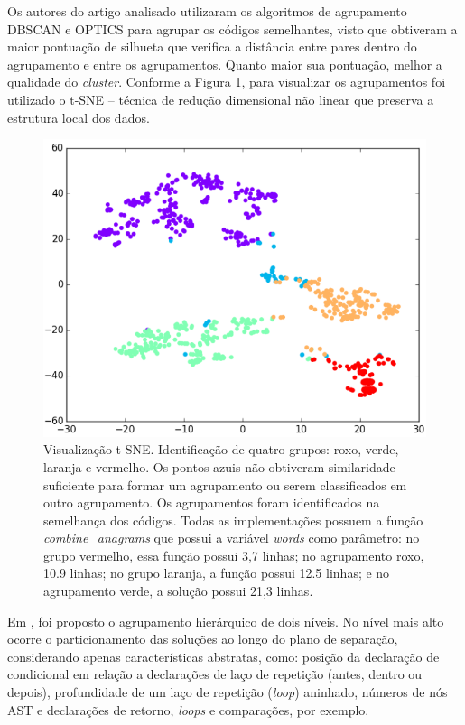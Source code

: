     Os autores do artigo analisado utilizaram os algoritmos de agrupamento
    DBSCAN\cite{Ester1996} e OPTICS\cite{Ankerst1999} para agrupar os códigos
    semelhantes, visto que obtiveram a maior pontuação de silhueta que verifica
    a distância entre pares dentro do agrupamento e entre os agrupamentos.
    Quanto maior sua pontuação, melhor a qualidade do \textit{cluster}. Conforme
    a Figura \ref{fig:t-SNE}, para visualizar os agrupamentos foi utilizado o
    t-SNE – técnica de redução dimensional não linear que preserva a estrutura
    local dos dados.
    \begin{figure}[ht]
        \centering
        \includegraphics[scale=0.5]{imagem/visualizacao-tSNE.png}
        \caption{Visualização t-SNE. Identificação de quatro grupos: roxo, verde,
        	laranja e vermelho. Os pontos azuis não obtiveram similaridade
        	suficiente para formar um agrupamento ou serem classificados em
        	outro agrupamento. Os agrupamentos foram identificados na semelhança
        	dos códigos. Todas as implementações possuem a função \textit{combine\_anagrams}
        	que possui a variável \textit{words} como parâmetro: no grupo vermelho,
        	essa função possui 3,7 linhas; no agrupamento roxo, 10.9 linhas; no
        	grupo laranja, a função possui 12.5 linhas; e no agrupamento verde,
        	a solução possui 21,3 linhas.}
        \label{fig:t-SNE}
    \end{figure}

    
    Em , foi proposto o agrupamento hierárquico de dois
    níveis. No nível mais alto ocorre o particionamento das soluções ao longo do
    plano de separação, considerando apenas características abstratas, como:
    posição da declaração de condicional em relação a declarações de laço de
    repetição (antes, dentro ou depois), profundidade de um laço de repetição
    (\textit{loop}) aninhado, números de nós AST e declarações de retorno,
    \textit{loops} e comparações, por exemplo.
    
